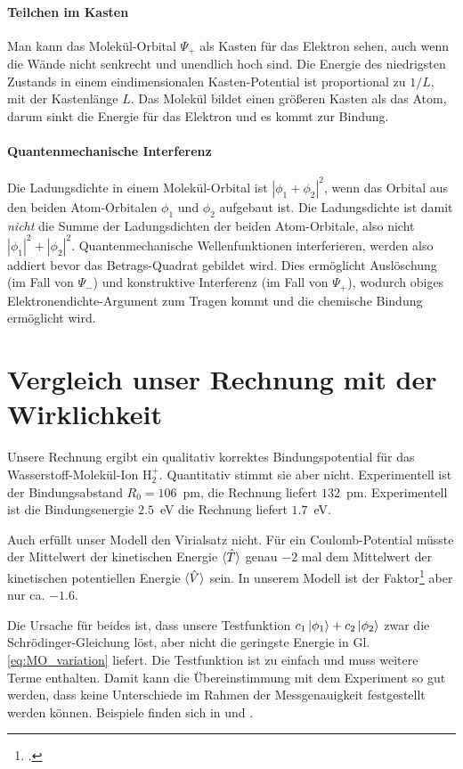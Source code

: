 \paragraph{Teilchen im Kasten}  Man kann das Molekül-Orbital $\Psi_+$ als Kasten für das Elektron sehen, auch wenn die Wände nicht senkrecht und unendlich hoch sind. Die Energie des niedrigsten Zustands in einem eindimensionalen  Kasten-Potential ist proportional zu $1/L$, mit der Kastenlänge $L$. Das Molekül bildet einen größeren Kasten als das Atom, darum sinkt die Energie für das Elektron und es kommt zur Bindung.

\paragraph{Quantenmechanische Interferenz} Die Ladungsdichte in einem Molekül-Orbital ist $| \phi_1 + \phi_2 |^2$, wenn das Orbital aus den beiden Atom-Orbitalen $\phi_1$ und $\phi_2$ aufgebaut ist. Die Ladungsdichte ist damit \emph{nicht} die Summe der Ladungsdichten der beiden Atom-Orbitale, also nicht $| \phi_1 |^2 +| \phi_2 |^2$. Quantenmechanische Wellenfunktionen interferieren, werden also addiert bevor das Betrags-Quadrat gebildet wird. Dies ermöglicht Auslöschung (im Fall von $\Psi_-$) und konstruktive Interferenz (im Fall von $\Psi_+$), wodurch obiges Elektronendichte-Argument zum Tragen kommt und  die chemische Bindung ermöglicht wird.


\section{Vergleich unser Rechnung mit der Wirklichkeit}

Unsere Rechnung ergibt ein qualitativ korrektes Bindungspotential für das  Wasserstoff-Molekül-Ion H$_2^+$. Quantitativ stimmt sie aber nicht. Experimentell ist der Bindungsabstand $R_0 = 106$~pm, die Rechnung liefert $132$~pm. Experimentell ist die Bindungsenergie $2.5$~eV die Rechnung liefert $1.7$~eV.

Auch erfüllt unser Modell den Virialsatz nicht. Für ein Coulomb-Potential müsste der Mittelwert der kinetischen Energie $\braket{\hat{T}}$ genau $-2$ mal dem Mittelwert der kinetischen potentiellen Energie $\braket{\hat{V}}$ sein. In unserem Modell ist der Faktor\footcite{McQuarrie2008} aber nur ca. $-1.6$.

Die Ursache für beides ist, dass unsere Testfunktion $c_1 \ket{\phi_1} + c_2 \ket{\phi_2}$ zwar die Schrödinger-Gleichung löst, aber nicht die geringste Energie in Gl. \ref{eq:MO_variation} liefert. Die Testfunktion ist zu einfach und muss weitere Terme enthalten. Damit kann die Übereinstimmung mit dem Experiment so gut werden, dass keine Unterschiede im Rahmen der Messgenauigkeit festgestellt werden können. Beispiele finden sich in \cite{McQuarrie2008} und \cite{Demtröder_AMP} .


\printbibliography[segment=\therefsegment,heading=subbibliography]

